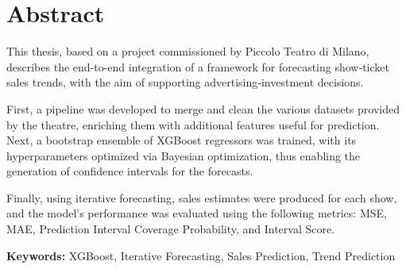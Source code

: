 \documentclass{Configuration_Files/PoliMi3i_thesis}
\begin{document}


\pagestyle{empty} %
\frontmatter %


\startpreamble
\setcounter{page}{1} %

\chapter*{Abstract} 
This thesis, based on a project commissioned by Piccolo Teatro di Milano, describes the end-to-end integration of a framework for forecasting show‐ticket sales trends, with the aim of supporting advertising‐investment decisions.

First, a pipeline was developed to merge and clean the various datasets provided by the theatre, enriching them with additional features useful for prediction. Next, a bootstrap ensemble of XGBoost regressors was trained, with its hyperparameters optimized via Bayesian optimization, thus enabling the generation of confidence intervals for the forecasts.

Finally, using iterative forecasting, sales estimates were produced for each show, and the model’s performance was evaluated using the following metrics: MSE, MAE, Prediction Interval Coverage Probability, and Interval Score.

\textbf{Keywords:} XGBoost, Iterative Forecasting, Sales Prediction, Trend Prediction %
\end{document}
